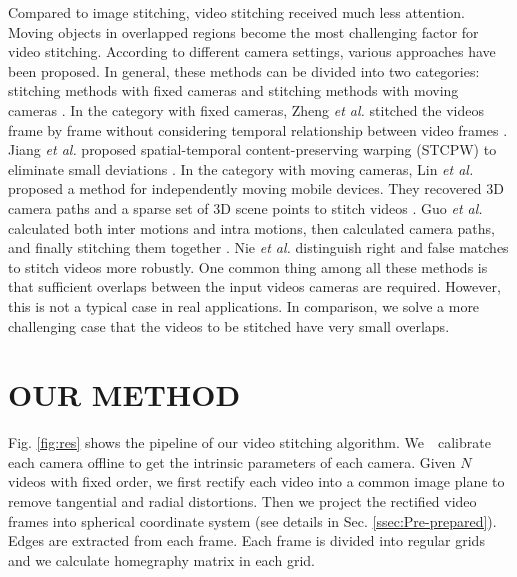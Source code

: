 \documentclass[conference]{IEEEtran}
\begin{document}
 Compared to image stitching, video stitching received much less attention. 
Moving objects in overlapped regions become the most challenging factor for video stitching.
%
According to different camera settings, various approaches have been proposed. In general, these methods can be divided into two categories: 
stitching methods with fixed cameras \cite{zheng2008stitching, he2010panoramic, Jiang_2015_CVPR_Workshops, perazzi2015panoramic, li2015efficient} 
and stitching methods with moving cameras \cite{lin2016seamless, guo2016joint, nie2018dynamic}. 
%
In the category with fixed cameras, Zheng \textit{et al.} stitched the videos frame by frame without considering temporal relationship between video frames \cite{zheng2008stitching}.
Jiang \textit{et al.} proposed spatial-temporal content-preserving warping (STCPW) to eliminate small deviations \cite{Jiang_2015_CVPR_Workshops}.
In the category with moving cameras, 
Lin \textit{et al.} proposed a method for independently moving mobile devices.
They recovered 3D camera paths and a sparse set of 3D scene points to stitch videos \cite{lin2016seamless}.
Guo \textit{et al.} calculated both inter
motions and intra motions, then calculated camera paths, and finally stitching them together \cite{guo2016joint}.
Nie \textit{et al.} distinguish right and false matches \cite{nie2018dynamic} to stitch videos more robustly. 
One common thing among all these methods is that sufficient overlaps between the input videos cameras are required. 
However, this is not a typical case in real applications. 
In comparison, we solve a more challenging case that the videos to be stitched have very small overlaps.

\section{OUR METHOD}
\label{sec:ourmethod}

Fig. \ref{fig:res} shows the pipeline of our video stitching algorithm.
We　calibrate each camera offline to get the intrinsic parameters of each camera. 
Given $N$ videos with fixed order, we first rectify each video into a common image plane to remove tangential and radial distortions.
Then we project the rectified video frames into spherical coordinate system (see details in Sec. \ref{ssec:Pre-prepared}). 
Edges are extracted from each frame.
Each frame is divided into regular grids and we calculate homegraphy matrix in each grid. 
\end{document}

